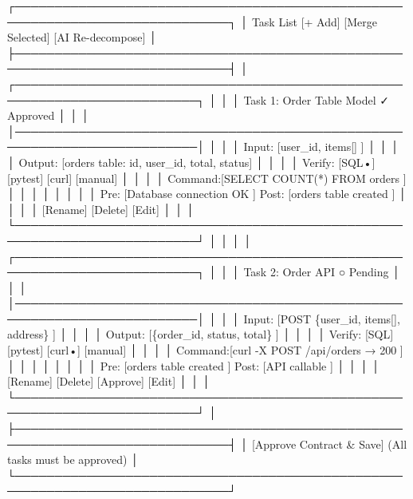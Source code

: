 \documentclass[
]{article}
\newenvironment{Shaded}{}{}
\newcommand{\NormalTok}[1]{#1}
\begin{document}
\begin{Shaded}
\begin{Highlighting}[]
\NormalTok{┌─────────────────────────────────────────────────────────────────────────────┐}
\NormalTok{│ Task List                                 [+ Add] [Merge Selected] [AI Re{-}decompose] │}
\NormalTok{├─────────────────────────────────────────────────────────────────────────────┤}
\NormalTok{│ ┌─────────────────────────────────────────────────────────────────────────┐ │}
\NormalTok{│ │ Task 1: Order Table Model                                    ✓ Approved │ │}
\NormalTok{│ │─────────────────────────────────────────────────────────────────────────│ │}
\NormalTok{│ │ Input:  [user\_id, items[]                      ]                        │ │}
\NormalTok{│ │ Output: [orders table: id, user\_id, total, status]                      │ │}
\NormalTok{│ │ Verify: [SQL•] [pytest] [curl] [manual]                                 │ │}
\NormalTok{│ │ Command:[SELECT COUNT(*) FROM orders           ]                        │ │}
\NormalTok{│ │                                                                         │ │}
\NormalTok{│ │ Pre:    [Database connection OK    ]  Post: [orders table created  ]    │ │}
\NormalTok{│ │                                             [Rename] [Delete] [Edit]    │ │}
\NormalTok{│ └─────────────────────────────────────────────────────────────────────────┘ │}
\NormalTok{│                                                                             │}
\NormalTok{│ ┌─────────────────────────────────────────────────────────────────────────┐ │}
\NormalTok{│ │ Task 2: Order API                                            ○ Pending  │ │}
\NormalTok{│ │─────────────────────────────────────────────────────────────────────────│ │}
\NormalTok{│ │ Input:  [POST \{user\_id, items[], address\}      ]                        │ │}
\NormalTok{│ │ Output: [\{order\_id, status, total\}             ]                        │ │}
\NormalTok{│ │ Verify: [SQL] [pytest] [curl•] [manual]                                 │ │}
\NormalTok{│ │ Command:[curl {-}X POST /api/orders → 200        ]                        │ │}
\NormalTok{│ │                                                                         │ │}
\NormalTok{│ │ Pre:    [orders table created      ]  Post: [API callable          ]    │ │}
\NormalTok{│ │                                     [Rename] [Delete] [Approve] [Edit]  │ │}
\NormalTok{│ └─────────────────────────────────────────────────────────────────────────┘ │}
\NormalTok{├─────────────────────────────────────────────────────────────────────────────┤}
\NormalTok{│                                          [Approve Contract \& Save] (All tasks must be approved) │}
\NormalTok{└─────────────────────────────────────────────────────────────────────────────┘}
\end{Highlighting}
\end{Shaded}
\end{document}
